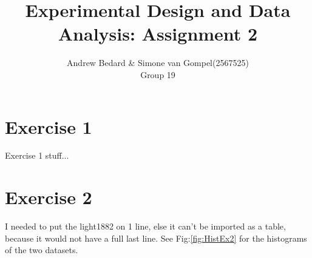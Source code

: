 \documentclass{article}
\title{Experimental Design and Data Analysis: Assignment 2}
\author{Andrew Bedard \& Simone van Gompel(2567525) \\ Group 19}
\begin{document}
  \maketitle

  \section{Exercise 1}
    Exercise 1 stuff...

  \section{Exercise 2}
    I needed to put the light1882 on 1 line, else it can't be imported as a table,
    because it would not have a full last line.
    See Fig:\ref{fig:HistEx2} for the histograms of the two datasets.
\end{document}
